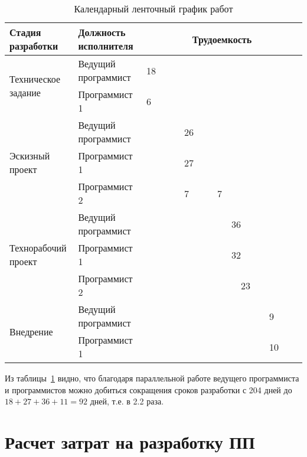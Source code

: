 \begin{table}[ht]\footnotesize
\caption{Календарный ленточный график работ}
\begin{tabular}{|l|l|llll|llll|llll|llll|}
\hline
Стадия разработки & Должность исполнителя & \multicolumn{16}{c|}{Трудоемкость} \\ 
\hline
\multirow{2}{0.2\textwidth}{Техническое задание} & Ведущий программист & \multicolumn{4}{l|}{\cellcolor[gray]{0.6}18} & & & & & & & & & & & &\\
& Программист 1 & \multicolumn{2}{l|}{\cellcolor[gray]{0.8}6} & {} & {} & & & & & & & & & & & & \\
\hline
\multirow{3}{0.2\textwidth}{Эскизный проект} & Ведущий программист & & & & & \multicolumn{4}{l|}{\cellcolor[gray]{0.8}26} & & & & & & & & \\
& Программист 1 & & & & & \multicolumn{4}{l|}{\cellcolor[gray]{0.6}27} & & & & & & & &\\
& Программист 2 & & & & &  \cellcolor[gray]{0.8}7 & {} & {} & \cellcolor[gray]{0.8}7 & & & & & & & & \\
\hline
\multirow{3}{0.2\textwidth}{Технорабочий проект} & Ведущий программист & & & & & & & & &\multicolumn{4}{l|}{\cellcolor[gray]{0.6}36} & & & & \\
& Программист 1 & & & & & & & & &\multicolumn{4}{l|}{\cellcolor[gray]{0.8}32} & & & & \\
& Программист 2 & & & & & & & & & {} & \multicolumn{3}{l|}{\cellcolor[gray]{0.8}23} & {} & & & \\
\hline
\multirow{2}{0.2\textwidth}{Внедрение} & Ведущий программист & & & & & & & & & & & & &\multicolumn{4}{l|}{\cellcolor[gray]{0.8}9} \\
& Программист 1 & & & & & & & & & & & & & \multicolumn{4}{l|}{\cellcolor[gray]{0.6}10}\\
\hline
\end{tabular}
\label{tab:timeline}
\end{table}

\normalsize 

Из таблицы~\ref{tab:timeline} видно, что благодаря параллельной работе ведущего программиста и программистов можно добиться сокращения сроков разработки с  204 дней до $18 + 27  + 36 + 11 = 92$ дней, т.е. в 2.2 раза.

\section{Расчет затрат на разработку ПП}
